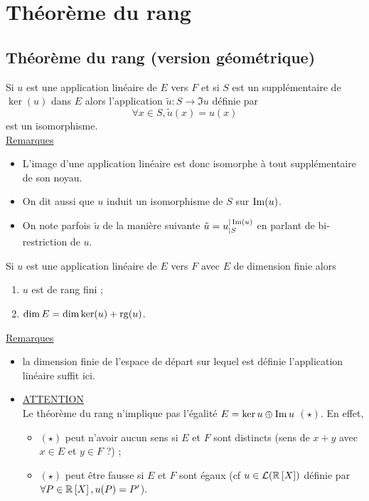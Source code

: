 \section{Théorème du rang}
\subsection{Théorème du rang (version géométrique)}
\begin{theo}
    Si \(u\) est une application linéaire de \(E\) vers \(F\) et si \(S\) est un supplémentaire de \(\ker(u)\) dans \(E\) alors l’application \(\tilde{u} : S \to \Im u\) définie par
   \[ \forall x \in  S, \tilde{u}(x) = u(x)\]
    est un isomorphisme.\\
    \underline{Remarques}\\
    \begin{itemize}
        \item L’image d’une application linéaire est donc isomorphe à tout supplémentaire de son noyau.
        \item On dit aussi que \(u\) induit un isomorphisme de \(S\) sur \(\operatorname{Im}(u)\).
        \item On note parfois \(\tilde{u}\) de la manière suivante \(\tilde{u} = u^{|\operatorname{Im}(u)}_{|S}\) en parlant de bi-restriction de \(u\).
    \end{itemize}
\end{theo}

\begin{theo}
    Si \(u\) est une application linéaire de \(E\) vers \(F\) avec \(E\) de dimension finie alors
    \begin{enumerate}
        \item \(u\) est de rang fini ;
        \item \(\dim E = \dim \ker (u) + \operatorname{rg}(u)\).
    \end{enumerate}
    \underline{Remarques}\\
    \begin{itemize}
        \item la dimension finie de l’espace de départ sur lequel est définie l’application linéaire suffit ici.
        \item \underline{ATTENTION}\\
            Le théorème du rang n’implique pas l’égalité \(E = \ker u \oplus \operatorname{Im} u\) \((\star)\). En effet,
        \begin{itemize}
            \item \((\star)\) peut n’avoir aucun sens si \(E\) et \(F\) sont distincts (sens de \(x + y\) avec \(x \in  E\) et \(y \in  F\) ?) ;
            \item \((\star)\) peut être fausse si \(E\) et \(F\) sont égaux (cf \(u \in  \mathcal{L} (\mathbb{R} \left[X\right])\) définie par \(\forall P \in  \mathbb{R} \left[X\right] , u(P ) = P '\)).
        \end{itemize}
    \end{itemize}
\end{theo}

